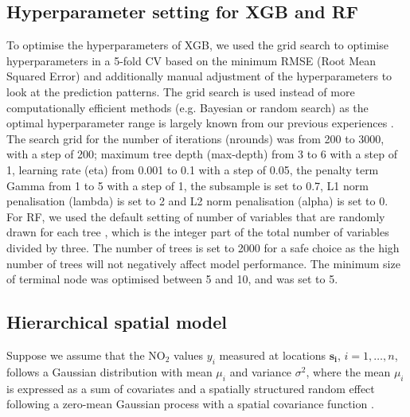 \documentclass{article}
\begin{document}
\subsection{Hyperparameter setting for XGB and RF}
\label{sec:hp}

To optimise the hyperparameters of XGB, we used the grid search to optimise hyperparameters in a 5-fold CV based on the minimum RMSE (Root Mean Squared Error) and additionally manual adjustment of the hyperparameters to look at the prediction patterns. The grid search is used instead of more computationally efficient methods (e.g. Bayesian or random search) as the optimal hyperparameter range is largely known from our previous experiences \citep{luglobal,nijmegen}. The search grid for the number of iterations (nrounds) was from 200 to 3000, with a step of 200; maximum tree depth (max-depth) from 3 to 6 with a step of 1, learning rate (eta) from 0.001 to 0.1 with a step of 0.05, the penalty term Gamma \citep{xgboost} from 1 to 5 with a step of 1, the subsample is set to 0.7, L1 norm penalisation (lambda) is set to 2 and L2 norm penalisation (alpha) is set to 0. %
For RF, we used the default setting of number of variables that are randomly drawn for each tree \citep{breiman2001random}, which is the integer part of the total number of variables divided by three. The number of trees is set to 2000 for a safe choice as the high number of trees will not negatively affect model performance. The minimum size of terminal node was optimised between 5 and 10, and was set to 5.  




\subsection{Hierarchical spatial model}

Suppose we assume that the NO$_2$ values $y_i$ measured at locations $\boldsymbol{s_i}$, $i=1,\ldots,n$, follows a Gaussian distribution with mean $\mu_i$ and variance $\sigma^2$, where the mean $\mu_i$ is expressed as a sum of covariates and a spatially structured random effect following a zero-mean Gaussian process with a spatial covariance function \citep{moraga2019}.
\end{document}
